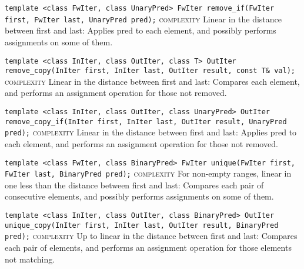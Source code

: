 \noindent{}\hspace*{0.25em}\lstinline[basicstyle=\ttfamily\color{corange}]{template <class FwIter, class UnaryPred> FwIter remove_if(FwIter first, FwIter last, UnaryPred pred);} \textsc{complexity} Linear in the distance between first and last: Applies pred to each element, and possibly performs assignments on some of them.\\\vspace{-0.6em}

\noindent{}\hspace*{0.25em}\lstinline[basicstyle=\ttfamily\color{corange}]{template <class InIter, class OutIter, class T> OutIter remove_copy(InIter first, InIter last, OutIter result, const T& val);} \textsc{complexity} Linear in the distance between first and last: Compares each element, and performs an assignment operation for those not removed.\\\vspace{-0.6em}

\noindent{}\hspace*{0.25em}\lstinline[basicstyle=\ttfamily\color{corange}]{template <class InIter, class OutIter, class UnaryPred> OutIter remove_copy_if(InIter first, InIter last, OutIter result, UnaryPred pred);} \textsc{complexity} Linear in the distance between first and last: Applies pred to each element, and performs an assignment operation for those not removed.\\\vspace{-0.6em}

\noindent{}\hspace*{0.25em}\lstinline[basicstyle=\ttfamily\color{corange}]{template <class FwIter, class BinaryPred> FwIter unique(FwIter first, FwIter last, BinaryPred pred);} \textsc{complexity} For non-empty ranges, linear in one less than the distance between first and last: Compares each pair of consecutive elements, and possibly performs assignments on some of them.\\\vspace{-0.6em}

\noindent{}\hspace*{0.25em}\lstinline[basicstyle=\ttfamily\color{corange}]{template <class InIter, class OutIter, class BinaryPred> OutIter unique_copy(InIter first, InIter last, OutIter result, BinaryPred pred);} \textsc{complexity} Up to linear in the distance between first and last: Compares each pair of elements, and performs an assignment operation for those elements not matching.\\\vspace{-0.6em}

